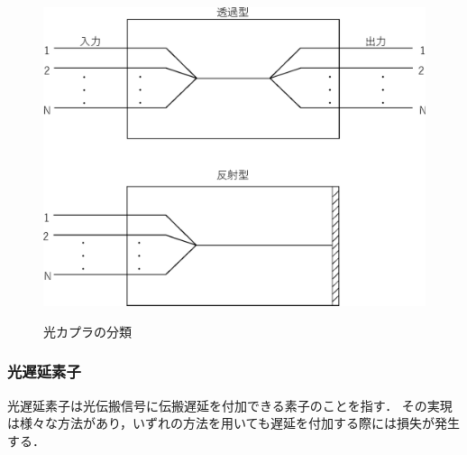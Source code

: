 \begin{figure}[t!]
\begin{center}
{\includegraphics[keepaspectratio, scale=0.4]{fig/3/lcoup4.eps}
\label{fig:lcoup4}
}
\caption{光カプラの分類}
\label{fig:lcoup}
\end{center}
\end{figure}

\subsubsection{光遅延素子}
光遅延素子は光伝搬信号に伝搬遅延を付加できる素子のことを指す．
その実現は様々な方法があり，いずれの方法を用いても遅延を付加する際には損失が発生する．

